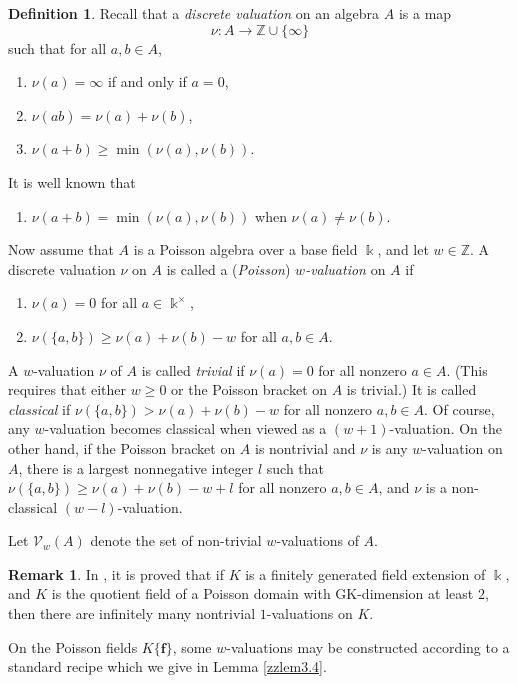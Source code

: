 \documentclass[12pt]{amsart}
\theoremstyle{plain}
\numberwithin{theorem}{section}
\numberwithin{equation}{theorem}
\theoremstyle{definition}
\newtheorem{definition}[theorem]{Definition}
\newtheorem{remark}[theorem]{Remark}
\newcommand{\ZZ}{\mathbb{Z}}
\newcommand \bff {{\mathbf{f}}}
\begin{document}
\begin{definition}
\label{zzdef3.1}
Recall that a \emph{discrete valuation} on an 
algebra $A$ is a map
$$\nu: A\to {\ZZ}\cup\{\infty\}$$
such that for all $a,b \in A$,
\begin{enumerate}
\item[(1)]
$\nu(a)=\infty$ if and only if $a=0$,
\item[(2)]
$\nu(ab)=\nu(a)+\nu(b)$,
\item[(3)]
$\nu(a+b)\geq \min(\nu(a),\nu(b))$.
\end{enumerate} 
It is well known that 
\begin{enumerate}
\item[($3^+$)] $\nu(a+b) = \min(\nu(a),\nu(b))$ 
when $\nu(a) \ne \nu(b)$.
\end{enumerate}

Now assume that $A$ is a Poisson algebra over 
a base field $\Bbbk$, and let $w \in \ZZ$.  
A discrete valuation $\nu$ on $A$ is called 
a (\emph{Poisson}) \emph{$w$-valuation} on $A$ if
\begin{enumerate}
\item[(4)]
$\nu(a)=0$ for all $a\in \Bbbk^{\times}$,
\item[(5)]
$\nu(\{a,b\})\geq \nu(a)+\nu(b)-w$ for all 
$a,b\in A$.
\end{enumerate} 

A $w$-valuation $\nu$ of $A$ is called 
{\it trivial} if $\nu(a)=0$ for all nonzero 
$a\in A$.  (This requires that either 
$w \ge 0$ or the Poisson bracket on $A$ 
is trivial.)  It is called {\it classical} 
if $\nu(\{a,b\})> \nu(a)+\nu(b)-w$ for all 
nonzero $a,b \in A$.  Of course, any 
$w$-valuation becomes classical when viewed 
as a $(w+1)$-valuation.  On the other hand, 
if the Poisson bracket on $A$ is nontrivial 
and $\nu$ is any $w$-valuation on $A$, there 
is a largest nonnegative integer $l$ such 
that $\nu(\{a,b\})\geq \nu(a)+\nu(b)-w+l$ 
for all nonzero $a,b \in A$, and $\nu$ is a 
non-classical $(w-l)$-valuation.

Let ${\mathcal V}_w(A)$ denote the set of 
non-trivial $w$-valuations of $A$. 
\end{definition}

\begin{remark}  
\label{zzrem3.2}
In \cite[Theorem 4.3(3)]{HTWZ1}, it is 
proved that if $K$ is a finitely generated 
field extension of $\Bbbk$, and $K$ is the
quotient field of a Poisson domain with 
GK-dimension at least $2$, then there are
infinitely many nontrivial $1$-valuations on $K$.

On the Poisson fields $K\{\bff\}$, some 
$w$-valuations may be constructed according 
to a standard recipe which we give in 
Lemma \ref{zzlem3.4}.
\end{remark}
\end{document}
